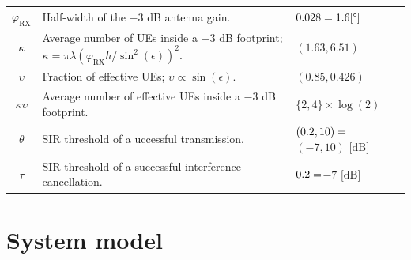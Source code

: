 \documentclass[lettersize,journal]{IEEEtran}
\begin{document}
\begin{table}
\begin{center}
\begin{tabular}{c|p{4.5cm}|p{1.9cm}}
      $\varphi_{\text{RX}}$ & Half-width of the $-3$ dB antenna gain.&$0.028= 1.6 [\degree] \hfill $ \\      
      $\kappa$& Average number of UEs inside a $-3$ dB footprint; $\kappa =\pi \lambda \left({\varphi_{\text{RX}}}h/{\sin^2(\epsilon)}\right)^2$.& $(1.63,6.51)$ \\
      $\upsilon$&Fraction of effective UEs; $\upsilon \propto \sin(\epsilon)$. &$(0.85,0.426)$ \\      
      $\kappa \upsilon$& Average number of effective UEs inside a $-3$ dB footprint.& $\{2,4\}\times \log(2)$ \\
      $\theta$ & SIR threshold of a uccessful transmission.&$(0.2,10)=\hfill$  \break  $(-7,10) \text{ [dB]}$ \\
      $\tau$ & SIR threshold of a successful interference cancellation.& $0.2=\hfill$\break $-7\text{ [dB]}$\\
     \bottomrule
    \end{tabular}
  \end{center}
\end{table}   


\section{System model}
\end{document}
